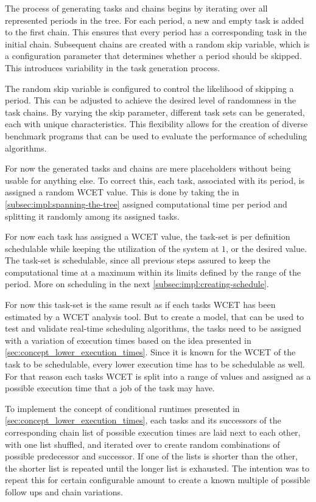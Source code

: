 The process of generating tasks and chains begins by iterating over all represented periods in the tree.
For each period, a new and empty task is added to the first chain.
This ensures that every period has a corresponding task in the initial chain.
Subsequent chains are created with a random skip variable, which is a configuration parameter that determines whether a period should be skipped.
This introduces variability in the task generation process.

The random skip variable is configured to control the likelihood of skipping a period.
This can be adjusted to achieve the desired level of randomness in the task chains.
By varying the skip parameter, different task sets can be generated, each with unique characteristics.
This flexibility allows for the creation of diverse benchmark programs that can be used to evaluate the performance of scheduling algorithms.

For now the generated tasks and chains are mere placeholders without being usable for anything else.
To correct this, each task, associated with its period, is assigned a random \ac{WCET} value.
This is done by taking the in \cref{subsec:impl:spanning-the-tree} assigned computational time per period and splitting it randomly among its assigned tasks.

For now each task has assigned a \ac{WCET} value, the task-set is per definition schedulable while keeping the utilization of the system at $1$, or the desired value.
The task-set is schedulable, since all previous steps assured to keep the computational time at a maximum within its limits defined by the range of the period.
More on scheduling in the next \cref{subsec:impl:creating-schedule}.

For now this task-set is the same result as if each tasks \ac{WCET} has been estimated by a \ac{WCET} analysis tool.
But to create a model, that can be used to test and validate real-time scheduling algorithms, the tasks need to be assigned with a variation of execution times based on the idea presented in \cref{sec:concept_lower_execution_times}.
Since it is known for the \ac{WCET} of the task to be schedulable, every lower execution time has to be schedulable as well.
For that reason each tasks \ac{WCET} is split into a range of values and assigned as a possible execution time that a job of the task may have.

To implement the concept of conditional runtimes presented in \cref{sec:concept_lower_execution_times}, each tasks and its successors of the corresponding chain list of possible execution times are laid next to each other, with one list shuffled, and iterated over to create random combinations of possible predecessor and successor.
If one of the lists is shorter than the other, the shorter list is repeated until the longer list is exhausted.
The intention was to repeat this for certain configurable amount to create a known multiple of possible follow ups and chain variations.

